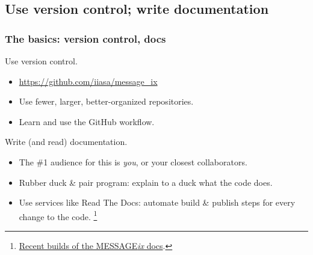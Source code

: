 \documentclass[12pt,aspectratio=169]{beamer}
\begin{document}
\begin{frame}[plain]
\tableofcontents[currentsection]
\end{frame}

\subsection{Use version control; write documentation}
\begin{frame}
\frametitle{The basics: version control, docs}

Use version control.
\begin{itemize}
  \item \url{https://github.com/iiasa/message_ix}
  \item Use fewer, larger, better-organized repositories.
  \item Learn and use the GitHub workflow.
\end{itemize}

\bigskip
Write (and read) documentation.
\begin{itemize}
  \item The \#1 audience for this is \emph{you}, or your closest collaborators.
  \item Rubber duck \& pair program: explain to a duck what the code does.
  \item Use services like Read The Docs: automate build \& publish steps for every change to the code.%
  \footnote{\href{https://readthedocs.com/projects/iiasa-energy-program-message-ix/}{Recent builds of the MESSAGE\emph{ix} docs}.}
\end{itemize}

\end{frame}
\end{document}
